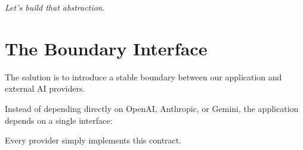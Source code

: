 \documentclass[11pt]{article}
\begin{document}
\vspace{0.18in}

\begin{center}
\color{brandgray}
\large\textit{Let's build that abstraction.}
\end{center}

\vfill

\newpage


\section*{The Boundary Interface}

\vspace{0.25in}

The solution is to introduce a stable boundary between our application and external AI providers.

Instead of depending directly on OpenAI, Anthropic, or Gemini, the application depends on a single interface:

\begin{center}
\end{center}

Every provider simply implements this contract.

\vspace{0.45in}
\end{document}
